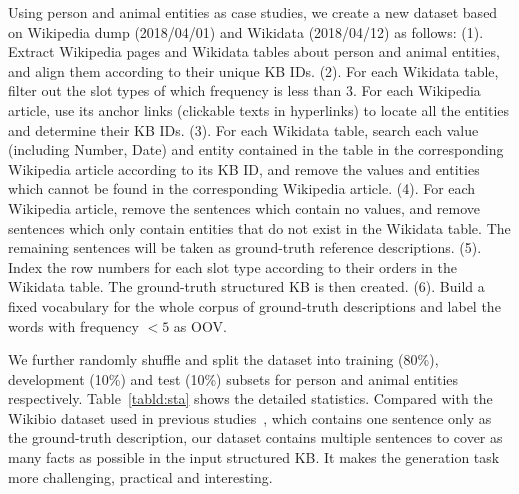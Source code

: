 \documentclass[11pt,a4paper]{article}
\begin{document}
Using person and animal entities as case studies, we create a new dataset based on Wikipedia dump (2018/04/01) and Wikidata (2018/04/12) as follows: (1). Extract Wikipedia pages and Wikidata tables about person and animal entities, and align them according to their unique KB IDs. (2). For each Wikidata table, filter out the slot types of which frequency is less than 3. For each Wikipedia article, use its anchor links (clickable texts in hyperlinks)  to locate all the entities and determine their KB IDs. (3). For each Wikidata table, search each value (including Number, Date) and entity contained in the table in the corresponding Wikipedia article according to its KB ID, and remove the values and entities which cannot be found in the corresponding Wikipedia article.
(4). For each Wikipedia article, remove the sentences which contain no values, and remove sentences which only contain entities that do not exist in the Wikidata table. 
The remaining sentences will be taken as ground-truth reference descriptions. (5). Index the row numbers for each slot type according to their orders in the Wikidata table. The ground-truth structured KB is then created. (6). Build a fixed vocabulary for the whole corpus of ground-truth descriptions and label the words with frequency $<5$ as OOV.















We further randomly shuffle and split the dataset into training (80\%), development (10\%) and test (10\%) subsets for person and animal entities respectively. Table~\ref{tabld:sta} shows the detailed statistics. Compared with the Wikibio dataset used in previous studies~\cite{biogen16,sha2017order,table2text17}, which contains one sentence only as the ground-truth description, our dataset contains multiple sentences to cover as many facts as possible in the input structured  KB. It makes the generation task more challenging, practical and interesting. 
\end{document}
